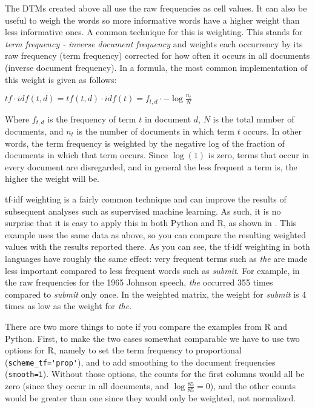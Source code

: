 The DTMs created above all use the raw frequencies as cell values.
It can also be useful to weigh the words so more informative words have a higher weight than less informative ones.
A common technique for this is  weighting.
This stands for \emph{term frequency - inverse document frequency} and weights each occurrency by its raw frequency (term frequency) corrected for how often it occurs in all documents (inverse document frequency). In a formula, the most common implementation of this weight is given as follows:

$tf\cdot idf(t,d)=tf(t,d)\cdot idf(t)=f_{t,d}\cdot -\log \frac{n_t}{N}$

Where $f_{t,d}$ is the frequency of term $t$ in document $d$, $N$ is the total number of documents, and $n_t$ is the number of documents in which term $t$ occurs. In other words, the term frequency is weighted by the negative log of the fraction of documents in which that term occurs. Since $\log(1)$ is zero, terms that occur in every document are disregarded, and in general the less frequent a term is, the higher the weight will be. 



tf$\cdot$idf weighting is a fairly common technique and can improve the results of subsequent analyses such as supervised machine learning.
As such, it is no surprise that it is easy to apply this in both Python and R, as shown in .
This example uses the same data as  above, so you can compare the resulting weighted values with the results reported there.
As you can see, the tf$\cdot$idf weighting in both languages have roughly the same effect:
very frequent terms such as \emph{the} are made less important compared to less frequent words such as \emph{submit}.
For example, in the raw frequencies for the 1965 Johnson speech, \emph{the} occurred 355 times compared to \emph{submit} only once.
In the weighted matrix, the weight for \emph{submit} is 4 times as low as the weight for \emph{the}.

There are two more things to note if you compare the examples from R and Python.
First, to make the two cases somewhat comparable we have to use two options for R, namely to set the term frequency to proportional (\verb|scheme_tf='prop'|),
and to add smoothing to the document frequencies (\verb|smooth=1|).
Without those options, the counts for the first columns would all be zero (since they occur in all documents, and $\log \frac{85}{85}=0$),
and the other counts would be greater than one since they would only be weighted, not normalized.

